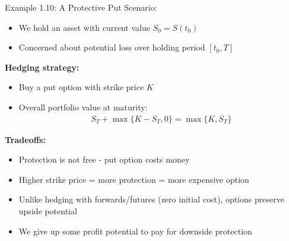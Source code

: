\documentclass[10pt]{beamer}
\begin{document}
\begin{frame}{Example 1.10: A Protective Put}
  Scenario:
  \begin{itemize}
    \item We hold an asset with current value $S_0 = S(t_0)$
    \item Concerned about potential loss over holding period $[t_0, T]$
  \end{itemize}
  
  \pause
  \textbf{Hedging strategy:}
  \begin{itemize}
    \item Buy a put option with strike price $K$
    \item Overall portfolio value at maturity:
    \begin{align*}
      S_T + \max\{K - S_T, 0\} = \max\{K, S_T\}
    \end{align*}
  \end{itemize}
  
  \pause
  \textbf{Tradeoffs:}
  \begin{itemize}
    \item Protection is not free - put option costs money
    \item Higher strike price = more protection = more expensive option
    \item Unlike hedging with forwards/futures (zero initial cost), options preserve upside potential
    \item We give up some profit potential to pay for downside protection
  \end{itemize}
\end{frame}
\end{document}
